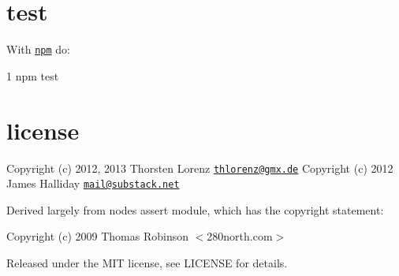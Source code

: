 \section*{test }

With \href{http://npmjs.org}{\tt npm} do\+:


\begin{DoxyCode}
1 npm test
\end{DoxyCode}


\section*{license }

Copyright (c) 2012, 2013 Thorsten Lorenz \href{mailto:thlorenz@gmx.de}{\tt thlorenz@gmx.\+de} Copyright (c) 2012 James Halliday \href{mailto:mail@substack.net}{\tt mail@substack.\+net}

Derived largely from node\textquotesingle{}s assert module, which has the copyright statement\+:

Copyright (c) 2009 Thomas Robinson $<$280north.\+com$>$

Released under the M\+I\+T license, see L\+I\+C\+E\+N\+S\+E for details. 